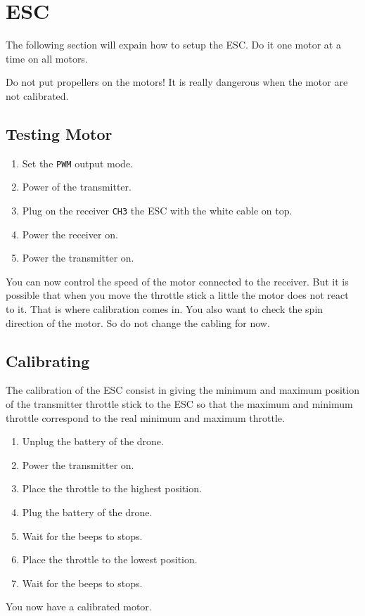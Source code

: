 \section{ESC}
The following section will expain how to setup the ESC.
Do it one motor at a time on all motors.

Do not put propellers on the motors! It is really dangerous when the motor are not calibrated.
\subsection{Testing Motor}

\begin{enumerate}
    \item Set the \texttt{PWM} output mode.
    \item Power of the transmitter.
    \item Plug on the receiver \texttt{CH3} the ESC with the white cable on top.
    \item Power the receiver on.
    \item Power the transmitter on.
\end{enumerate}
You can now control the speed of the motor connected to the receiver. But it is possible that when you move the throttle stick a little the motor does not react to it. That is where calibration comes in. You also want to check the spin direction of the motor. So do not change the cabling for now.

\subsection{Calibrating}
The calibration of the ESC consist in giving the minimum and maximum position of the transmitter throttle stick to the ESC so that the maximum and minimum throttle correspond to the real minimum and maximum throttle.

\begin{enumerate}
    \item Unplug the battery of the drone.
    \item Power the transmitter on.
    \item Place the throttle to the highest position.
    \item Plug the battery of the drone.
    \item Wait for the beeps to stops.
    \item Place the throttle to the lowest position.
    \item Wait for the beeps to stops.
\end{enumerate}
You now have a calibrated motor.



